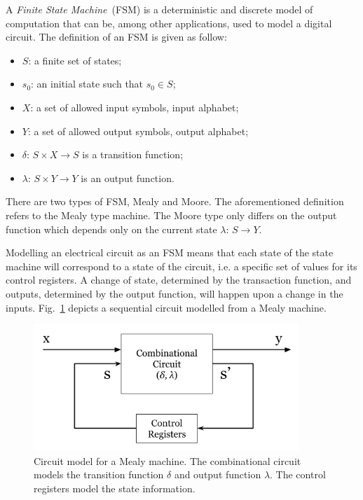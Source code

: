 A \textit{Finite State Machine}~(FSM) is a deterministic and discrete model of computation that can be, among other applications, used to model a digital circuit. The definition of an FSM is given as follow:

\begin{itemize}
    \item[] $S$: a finite set of states;
    \item[] $s_{0}$: an initial state such that $s_0 \in S$;
    \item[] $X$: a set of allowed input symbols, input alphabet;
    \item[] $Y$: a set of allowed output symbols, output alphabet;
    \item[] $\delta$: $S \times X \to S$ is a transition function;
    \item[] $\lambda$: $S \times Y \to Y$ is an output function.
\end{itemize}

There are two types of FSM, Mealy and Moore. The aforementioned definition refers to the Mealy type machine. The Moore type only differs on the output function which depends only on the current state $\lambda$: $S \to Y$.

Modelling an electrical circuit as an FSM means that each state of the state machine will correspond to a state of the circuit, i.e. a specific set of values for its control registers. A change of state, determined by the transaction function, and outputs, determined by the output function, will happen upon a change in the inputs. Fig.~\ref{fig:mealy_circuit} depicts a sequential circuit modelled from a Mealy machine.

\begin{figure}[htb!]
	\centering
	\includegraphics[width=10cm]{images/mealy_circuit.png}
	\caption{Circuit model for a Mealy machine. The combinational circuit models the transition function $\delta$ and output function $\lambda$. The control registers model the state information.}
	\label{fig:mealy_circuit}
\end{figure}


